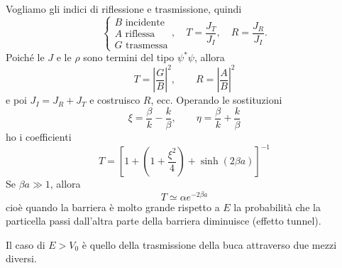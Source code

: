 \bigskip
\noindent
Vogliamo gli indici di riflessione e trasmissione, quindi 
\[
\begin{cases}
B \text{ incidente} \\
A \text{ riflessa} \\
G \text{ trasmessa}
\end{cases}, \quad T = \frac{J_T}{J_I}, \quad R = \frac{J_R}{J_I}.
\]
Poiché le \( J \) e le \( \rho \) sono termini del tipo \( \psi^* \psi \), allora 
\[
T = \left| \frac{G}{B} \right|^2, \qquad R = \left| \frac{A}{B} \right|^2
\]
e poi \( J_I = J_R + J_T \) e costruisco \( R \), ecc. Operando le sostituzioni
\[
\xi = \frac{\beta}{k} - \frac{k}{\beta}, \qquad \eta = \frac{\beta}{k} + \frac{k}{\beta}
\]
ho i coefficienti
\[
T = \left[ 1 + \left( 1 + \frac{\xi^2}{4} \right) + \sinh(2\beta a) \right]^{-1}
\]
Se \( \beta a \gg 1 \), allora
\[
T \simeq \alpha e^{-2\beta a}
\]
cioè quando la barriera è molto grande rispetto a \( E \) la probabilità che la particella passi dall'altra parte della barriera diminuisce (effetto tunnel).

\bigskip
\noindent
Il caso di \( E > V_0 \) è quello della trasmissione della buca attraverso due mezzi diversi.